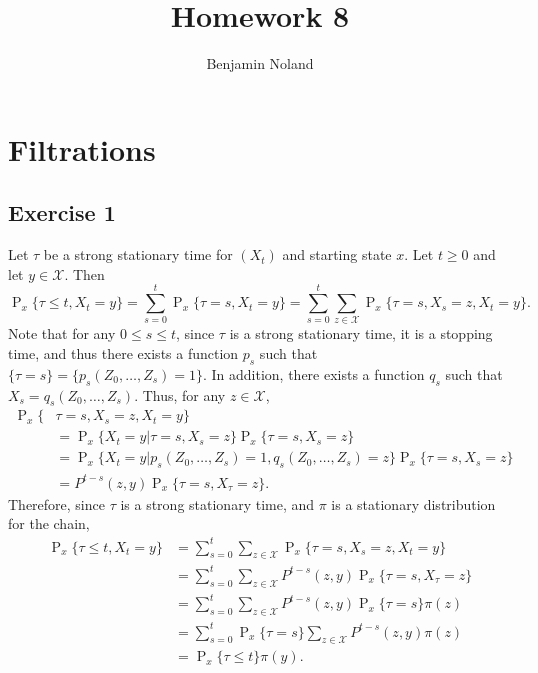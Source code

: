 \documentclass[12pt]{article}
\title{Homework 8}
\author{Benjamin Noland}
\date{}
\DeclareMathOperator{\Prob}{P}
\begin{document}
\maketitle

\section*{Filtrations}

\subsection*{Exercise 1}

Let $\tau$ be a strong stationary time for $(X_t)$ and starting state $x$. Let $t \geq 0$ and let $y \in \mathcal{X}$. Then
\begin{equation*}
\Prob_x\{\tau \leq t, X_t = y\} = \sum_{s=0}^t \Prob_x\{\tau = s, X_t = y\} = \sum_{s=0}^t \sum_{z \in \mathcal{X}} \Prob_x\{\tau = s, X_s = z, X_t = y\}.
\end{equation*}
Note that for any $0 \leq s \leq t$, since $\tau$ is a strong stationary time, it is a stopping time, and thus there exists a function $p_s$ such that $\{\tau = s\} = \{p_s(Z_0, \ldots, Z_s) = 1\}$. In addition, there exists a function $q_s$ such that $X_s = q_s(Z_0, \ldots, Z_s)$. Thus, for any $z \in \mathcal{X}$,
\begin{align*}
\Prob_x\{&\tau = s, X_s = z, X_t = y\} \\
&= \Prob_x\{X_t = y | \tau = s, X_s = z\} \Prob_x\{\tau = s, X_s = z\} \\
&= \Prob_x\{X_t = y | p_s(Z_0, \ldots, Z_s) = 1, q_s(Z_0, \ldots, Z_s) = z\} \Prob_x\{\tau = s, X_s = z\} \\
&= P^{t-s}(z, y) \Prob_x\{\tau = s, X_\tau = z\}.
\end{align*}
Therefore, since $\tau$ is a strong stationary time, and $\pi$ is a stationary distribution for the chain,
\begin{align*}
\Prob_x\{\tau \leq t, X_t = y\} &= \sum_{s=0}^t \sum_{z \in \mathcal{X}} \Prob_x\{\tau = s, X_s = z, X_t = y\} \\
&= \sum_{s=0}^t \sum_{z \in \mathcal{X}} P^{t-s}(z, y) \Prob_x\{\tau = s, X_\tau = z\} \\
&= \sum_{s=0}^t \sum_{z \in \mathcal{X}} P^{t-s}(z, y) \Prob_x\{\tau = s\} \pi(z) \\
&= \sum_{s=0}^t \Prob_x\{\tau = s\} \sum_{z \in \mathcal{X}} P^{t-s}(z, y) \pi(z) \\
&= \Prob_x\{\tau \leq t\} \pi(y).
\end{align*}
\end{document}
